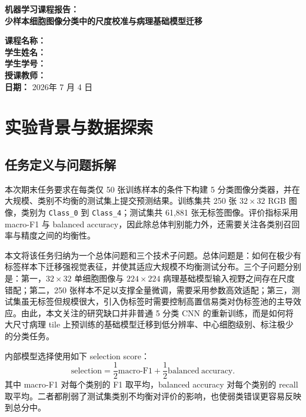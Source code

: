 \documentclass[a4paper,12pt]{article}
\begin{document}
\begin{center}
    {\LARGE \textbf{机器学习课程报告：}}\\
    \vspace{0.5em}
    {\LARGE \textbf{少样本细胞图像分类中的尺度校准与病理基础模型迁移}}
\end{center}

\vspace{7.5cm}

\begin{center}
\noindent \textbf{课程名称：}  \\
\noindent \textbf{学生姓名：} \underline{} \\
\noindent \textbf{学生学号：} \underline{} \\
\noindent \textbf{授课教师：}  \\
\noindent \textbf{日期：} 2026年 7 月 4 日
\end{center}

\newpage

\section{实验背景与数据探索}

\subsection{任务定义与问题拆解}

本次期末任务要求在每类仅 50 张训练样本的条件下构建 5 分类图像分类器，并在大规模、类别不均衡的测试集上提交预测结果。训练集共 250 张 \(32\times32\) RGB 图像，类别为 \texttt{Class\_0} 到 \texttt{Class\_4}；测试集共 61,881 张无标签图像。评价指标采用 macro-F1 与 balanced accuracy，因此除总体判别能力外，还需要关注各类别召回率与精度之间的均衡性。

本文将该任务归纳为一个总体问题和三个技术子问题。总体问题是：如何在极少有标签样本下迁移强视觉表征，并使其适应大规模不均衡测试分布。三个子问题分别是：第一，\(32\times32\) 单细胞图像与 \(224\times224\) 病理基础模型输入视野之间存在尺度错配；第二，250 张样本不足以支撑全量微调，需要采用参数高效适配；第三，测试集虽无标签但规模很大，引入伪标签时需要控制高置信易类对伪标签池的主导效应。由此，本文关注的研究缺口并非普通 5 分类 CNN 的重新训练，而是如何将大尺寸病理 tile 上预训练的基础模型迁移到低分辨率、中心细胞级别、标注极少的分类任务。

内部模型选择使用如下 selection score：
\begin{equation}
    \mathrm{selection}
    = \frac{1}{2}\mathrm{macro\text{-}F1}
    + \frac{1}{2}\mathrm{balanced\ accuracy}.
\end{equation}
其中 macro-F1 对每个类别的 F1 取平均，balanced accuracy 对每个类别的 recall 取平均。二者都削弱了测试集类别不均衡对评价的影响，也使弱类错误更容易反映到总分中。
\end{document}
